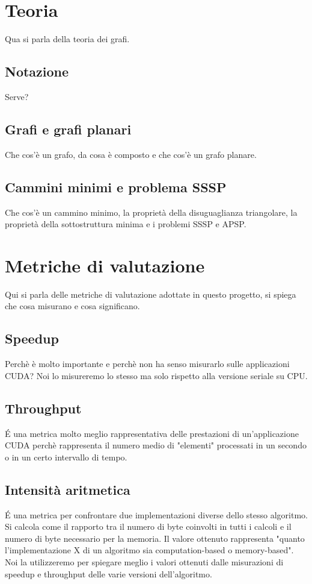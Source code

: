 \documentclass{article}
\begin{document}
	\section{Teoria}
	Qua si parla della teoria dei grafi.
	\subsection{Notazione}
	Serve?
	\subsection{Grafi e grafi planari}
	Che cos'è un grafo, da cosa è composto e che cos'è un grafo planare.
	\subsection{Cammini minimi e problema SSSP}
	Che cos'è un cammino minimo, la proprietà della disuguaglianza triangolare, la proprietà della sottostruttura minima e i problemi SSSP e APSP.
	
	\section{Metriche di valutazione}
	\label{section:metriche}
	Qui si parla delle metriche di valutazione adottate in questo progetto, si spiega che cosa misurano e cosa significano.
	
	\subsection{Speedup}
	Perchè è molto importante e perchè non ha senso misurarlo sulle applicazioni CUDA? Noi lo misureremo lo stesso ma solo rispetto alla versione seriale su CPU.
	
	\subsection{Throughput}
	\'E una metrica molto meglio rappresentativa delle prestazioni di un'applicazione CUDA perchè rappresenta il numero medio di "elementi" processati in un secondo o in un certo intervallo di tempo.
	
	\subsection{Intensità aritmetica}
	\'E una metrica per confrontare due implementazioni diverse dello stesso algoritmo. Si calcola come il rapporto tra il numero di byte coinvolti in tutti i calcoli e il numero di byte necessario per la memoria. Il valore ottenuto rappresenta "quanto l'implementazione X di un algoritmo sia computation-based o memory-based". Noi la utilizzeremo per spiegare meglio i valori ottenuti dalle misurazioni di speedup e throughput delle varie versioni dell'algoritmo.
	
\end{document}
